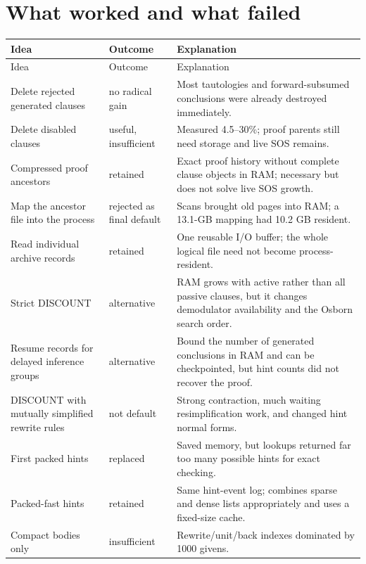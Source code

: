 \documentclass[11pt]{article}
\begin{document}
\section{What worked and what failed}

\begin{longtable}{>{\raggedright\arraybackslash}p{}
                  >{\raggedright\arraybackslash}p{}
                  >{\raggedright\arraybackslash}p{}}
\toprule
Idea & Outcome & Explanation \\
\midrule
\endfirsthead
\toprule
Idea & Outcome & Explanation \\
\midrule
\endhead
Delete rejected generated clauses & no radical gain & Most tautologies and
forward-subsumed conclusions were already destroyed immediately. \\
Delete disabled clauses & useful, insufficient & Measured 4.5--30\%; proof
parents still need storage and live SOS remains. \\
Compressed proof ancestors & retained & Exact proof history without complete
clause objects in RAM; necessary but does not solve live SOS growth. \\
Map the ancestor file into the process & rejected as final default & Scans
brought old pages into RAM;
a 13.1-GB mapping had 10.2 GB resident. \\
Read individual archive records & retained & One reusable I/O buffer; the whole
logical file need not become process-resident. \\
Strict DISCOUNT & alternative & RAM grows with active rather than all passive
clauses, but it changes
demodulator availability and the Osborn search order. \\
Resume records for delayed inference groups & alternative & Bound the number of
generated conclusions in RAM and can be checkpointed, but hint
counts did not recover the proof. \\
DISCOUNT with mutually simplified rewrite rules & not default & Strong
contraction, much waiting resimplification work, and changed hint normal forms. \\
First packed hints & replaced & Saved memory, but lookups returned far too many
possible hints for exact checking. \\
Packed-fast hints & retained & Same hint-event log; combines sparse and dense
lists appropriately and uses a fixed-size cache. \\
Compact bodies only & insufficient & Rewrite/unit/back indexes dominated by
1000 givens. \\

\end{longtable}
\end{document}
